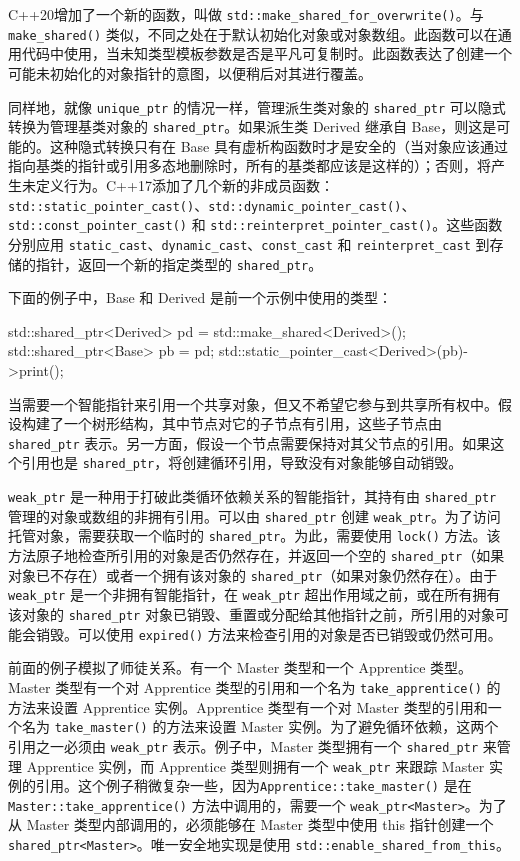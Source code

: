 C++20增加了一个新的函数，叫做 \verb|std::make_shared_for_overwrite()|。与 \verb|make_shared()| 类似，不同之处在于默认初始化对象或对象数组。此函数可以在通用代码中使用，当未知类型模板参数是否是平凡可复制时。此函数表达了创建一个可能未初始化的对象指针的意图，以便稍后对其进行覆盖。

同样地，就像 \verb|unique_ptr| 的情况一样，管理派生类对象的 \verb|shared_ptr| 可以隐式转换为管理基类对象的 \verb|shared_ptr|。如果派生类 Derived 继承自 Base，则这是可能的。这种隐式转换只有在 Base 具有虚析构函数时才是安全的（当对象应该通过指向基类的指针或引用多态地删除时，所有的基类都应该是这样的）；否则，将产生未定义行为。C++17添加了几个新的非成员函数：\verb|std::static_pointer_cast()|、\verb|std::dynamic_pointer_cast()|、\verb|std::const_pointer_cast()| 和 \verb|std::reinterpret_pointer_cast()|。这些函数分别应用 \verb|static_cast|、\verb|dynamic_cast|、\verb|const_cast| 和 \verb|reinterpret_cast| 到存储的指针，返回一个新的指定类型的 \verb|shared_ptr|。

下面的例子中，Base 和 Derived 是前一个示例中使用的类型：

\begin{cpp}
std::shared_ptr<Derived> pd = std::make_shared<Derived>();
std::shared_ptr<Base> pb = pd;
std::static_pointer_cast<Derived>(pb)->print();
\end{cpp}

当需要一个智能指针来引用一个共享对象，但又不希望它参与到共享所有权中。假设构建了一个树形结构，其中节点对它的子节点有引用，这些子节点由 \verb|shared_ptr| 表示。另一方面，假设一个节点需要保持对其父节点的引用。如果这个引用也是 \verb|shared_ptr|，将创建循环引用，导致没有对象能够自动销毁。

\verb|weak_ptr| 是一种用于打破此类循环依赖关系的智能指针，其持有由 \verb|shared_ptr| 管理的对象或数组的非拥有引用。可以由 \verb|shared_ptr| 创建 \verb|weak_ptr|。为了访问托管对象，需要获取一个临时的 \verb|shared_ptr|。为此，需要使用 \verb|lock()| 方法。该方法原子地检查所引用的对象是否仍然存在，并返回一个空的 \verb|shared_ptr|（如果对象已不存在）或者一个拥有该对象的 \verb|shared_ptr|（如果对象仍然存在）。由于 \verb|weak_ptr| 是一个非拥有智能指针，在 \verb|weak_ptr| 超出作用域之前，或在所有拥有该对象的 \verb|shared_ptr| 对象已销毁、重置或分配给其他指针之前，所引用的对象可能会销毁。可以使用 \verb|expired()| 方法来检查引用的对象是否已销毁或仍然可用。

前面的例子模拟了师徒关系。有一个 Master 类型和一个 Apprentice 类型。Master 类型有一个对 Apprentice 类型的引用和一个名为 \verb|take_apprentice()| 的方法来设置 Apprentice 实例。Apprentice 类型有一个对 Master 类型的引用和一个名为 \verb|take_master()| 的方法来设置 Master 实例。为了避免循环依赖，这两个引用之一必须由 \verb|weak_ptr| 表示。例子中，Master 类型拥有一个 \verb|shared_ptr| 来管理 Apprentice 实例，而 Apprentice 类型则拥有一个 \verb|weak_ptr| 来跟踪 Master 实例的引用。这个例子稍微复杂一些，因为\verb|Apprentice::take_master()| 是在 \verb|Master::take_apprentice()| 方法中调用的，需要一个 \verb|weak_ptr<Master>|。为了从 Master 类型内部调用的，必须能够在 Master 类型中使用 this 指针创建一个 \verb|shared_ptr<Master>|。唯一安全地实现是使用 \verb|std::enable_shared_from_this|。

